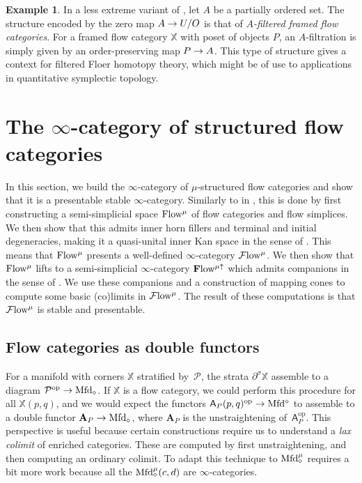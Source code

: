 \documentclass[10pt]{amsart}
\numberwithin{equation}{section}
\theoremstyle{definition}
\newtheorem{ex}[prop]{Example}
\DeclareMathOperator{\op}{op}
\newcommand{\Flow}{\cF\mathrm{low}\vphantom{w}}
\newcommand{\PreFlow}{\mathrm{Flow}\vphantom{w}}
\newcommand{\bfPreFlow}{\mathbf{F}\mathrm{low}\vphantom{w}}
\newcommand{\Mfd}{\mathrm{Mfd}\vphantom{d}}
\newcommand{\bX}{\mathbb{X}}
\newcommand{\cP}{\mathcal{P}}
\newcommand{\cF}{\mathcal{F}}
\newcommand{\bfA}{\mathbf{A}}
\newcommand{\sfA}{\mathsf{A}}
\newcommand{\del}{\partial}
\renewcommand{\to}{\mathchoice{\longrightarrow}{\rightarrow}{}{}}
\begin{document}
\begin{ex}\label{ex:filtered_floer_theory}
	In a less extreme variant of , let $A$ be a partially ordered set.
  The structure encoded by the zero map $A\to U/O$ is that of \emph{$A$-filtered framed flow categories}.
  For a framed flow category $\bX$ with poset of objects $P$, an $A$-filtration is simply given by an order-preserving map $P\to A$.
  This type of structure gives a context for filtered Floer homotopy theory, which might be of use to applications in quantitative symplectic topology.
\end{ex}

\section{The $\infty$-category of structured flow categories}\label{sec:the_infty-category_of_structured_flow_categories}

In this section, we build the $\infty$-category of $\mu$-structured flow categories and show that it is a presentable stable $\infty$-category.
Similarly to in \cite{AB}, this is done by first constructing a semi-simplicial space $\PreFlow^{\mu}$ of flow categories and flow simplices.
We then show that this admits inner horn fillers and terminal and initial degeneracies, making it a quasi-unital inner Kan space in the sense of .
This means that $\PreFlow^{\mu}$ presents a well-defined $\infty$-category $\Flow^{\mu}$.
We then show that $\PreFlow^{\mu}$ lifts to a semi-simplicial $\infty$-category $\bfPreFlow^{\mu\uparrow}$ which admits companions in the sense of .
We use these companions and a construction of mapping cones to compute some basic (co)limits in $\Flow^{\mu}$.
The result of these computations is that $\Flow^{\mu}$ is stable and presentable.

\subsection{Flow categories as double functors}\label{subsec:flow_categories_as_double_functors}


For a manifold with corners $\bX$ stratified by~$\cP$, the strata $\del^{\sigma}\bX$ assemble to a diagram $\cP^{\op} \to \Mfd_{\diamond}$.
If $\bX$ is a flow category, we could perform this procedure for all $\bX(p,q)$, and we would expect the functors $\sfA_{P}(p,q)^{\op} \to \Mfd^{\diamond}$ to assemble to a double functor $\bfA_{P} \to \Mfd_{\diamond}$, where $\bfA_{P}$ is the unstraightening of~$\sfA_{P}^{\op}$.
This perspective is useful because certain constructions require us to understand a \emph{lax colimit} of enriched categories.
These are computed by first unstraightening, and then computing an ordinary colimit.
To adapt this technique to $\Mfd_{\diamond}^{\mu}$ requires a bit more work because all the $\Mfd^{\mu}_{\diamond}(c,d)$ are $\infty$-categories.
\end{document}
